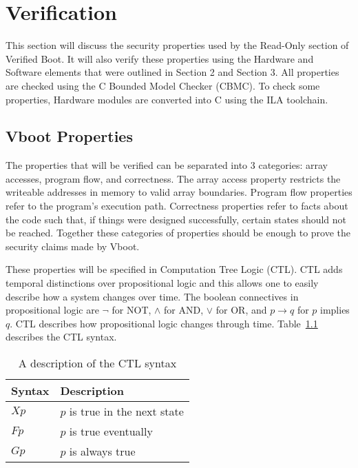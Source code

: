 \chapter{Verification}\label{sec:Verif}

This section will discuss the security properties used by the Read-Only
section of Verified Boot. 
It will also verify these properties using the Hardware and
Software elements that were outlined in Section 2 and Section 3.
All properties are checked using the C Bounded Model Checker (CBMC).
To check some properties, Hardware modules are converted into C using the ILA toolchain.

\section{Vboot Properties}

The properties that will be verified can be separated into 3 categories: array accesses, program flow, and correctness.
The array access property restricts the writeable addresses in memory to valid array boundaries. 
Program flow properties refer to the program's execution path.
Correctness properties refer to facts about the code such that, if things were
designed successfully, certain states should not be reached.
Together these categories of properties should be enough to prove the security claims made by Vboot.

These properties will be specified in Computation Tree Logic (CTL). 
CTL adds temporal distinctions over propositional logic and this allows one to easily describe how a system changes over time.
The boolean connectives in propositional logic are $\lnot$ for NOT, $\land$ for
AND, $\lor$ for OR, and $p \to q$ for $p$ implies $q$.
CTL describes how propositional logic changes through time.
Table~\ref{ctl_syn} describes the CTL syntax.

\begin{table}[!htbp]
    \centering
    \caption{A description of the CTL syntax}\label{ctl_syn}
    \begin{tabular}{ll}
        \toprule Syntax & Description  \\ \bottomrule 
        $Xp$ & $p$ is true in the next state\\ 
        $Fp$ & $p$ is true eventually\\ 
        $Gp$ & $p$ is always true\\ 
    \end{tabular}
\end{table}

